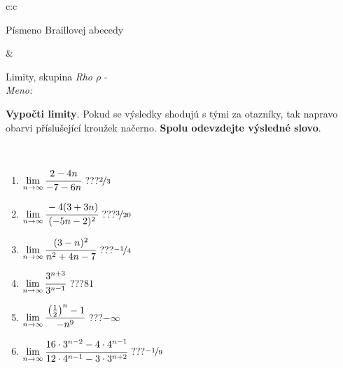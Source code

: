 \documentclass[10pt]{report}
\begin{document}
\begin{tabular}{c:c}
\begin{minipage}[c][104.5mm][t]{0.5\linewidth}
\begin{center}
\begin{minipage}{0.20\linewidth}
\begin{center}
{\small Písmeno Braillovej abecedy}
\end{center}
\end{minipage}
\end{center}
\end{minipage}
&
\begin{minipage}[c][104.5mm][t]{0.5\linewidth}
\begin{center}
\vspace{7mm}
{\huge Limity, skupina \textit{Rho $\rho$} -}\\[5mm]
\textit{Meno:}\phantom{xxxxxxxxxxxxxxxxxxxxxxxxxxxxxxxxxxxxxxxxxxxxxxxxxxxxxxxxxxxxxxxxx}\\[5mm]
\begin{minipage}{0.95\linewidth}
\begin{center}
\textbf{Vypočti limity}. Pokud se výsledky shodujú s tými za otazníky, tak napravo\\obarvi příslušející kroužek načerno. \textbf{Spolu odevzdejte výsledné slovo}.
\end{center}
\end{minipage}
\\[1mm]
\begin{minipage}{0.79\linewidth}
\begin{center}
\begin{varwidth}{\linewidth}
\begin{enumerate}
\normalsize
\item $\lim\limits_{n\to\infty}\cfrac{2-4n}{-7-6n}$\quad \dotfill\; ???\;\dotfill \quad $\nicefrac{2}{3}$
\item $\lim\limits_{n\to\infty}\cfrac{-4(3+3n)}{(-5n-2)^2}$\quad \dotfill\; ???\;\dotfill \quad $\nicefrac{3}{20}$
\item $\lim\limits_{n\to\infty}\cfrac{(3-n)^2}{n^2+4n-7}$\quad \dotfill\; ???\;\dotfill \quad $\nicefrac{-1}{4}$
\item $\lim\limits_{n\to\infty}\cfrac{3^{n+3}}{3^{n-1}}$\quad \dotfill\; ???\;\dotfill \quad $81$
\item $\lim\limits_{n\to\infty}\cfrac{\left(\frac{1}{2}\right)^n -1}{-n^{9}}$\quad \dotfill\; ???\;\dotfill \quad $-\infty$
\item $\lim\limits_{n\to\infty}\cfrac{16\cdot 3^{n-2}-4\cdot 4^{n-1}}{12\cdot 4^{n-1}-3\cdot 3^{n+2}}$\quad \dotfill\; ???\;\dotfill \quad $\nicefrac{-1}{9}$
\end{enumerate}
\end{varwidth}
\end{center}
\end{minipage}

\end{center}
\end{minipage}
\end{tabular}
\end{document}
